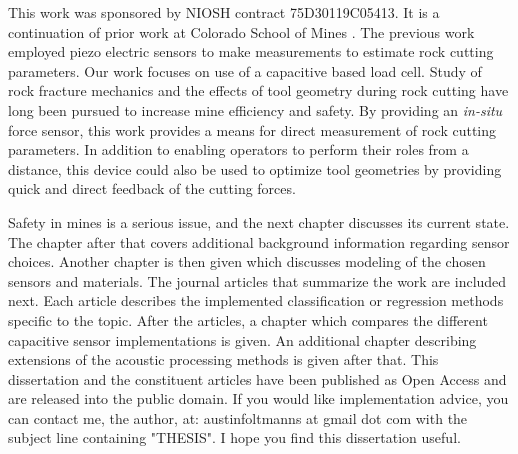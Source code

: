This work was sponsored by NIOSH contract 75D30119C05413.
It is a continuation of prior work at Colorado School of Mines \cite{11124/170545}.
The previous work employed piezo electric sensors to make measurements to estimate
rock cutting parameters. 
Our work focuses on use of a capacitive based load cell.
Study of rock fracture mechanics \cite{11124/14359} 
and the effects of tool geometry during rock cutting \cite{11124/13192, 11124/16423, 11124/176345} 
have long been pursued to increase mine efficiency and safety.
By providing an \textit{in-situ} force sensor, this work provides a means
for direct measurement of rock cutting parameters.
In addition to enabling operators to perform their roles from a distance,
this device could also be used to optimize tool geometries 
by providing quick and direct feedback of the cutting forces.

Safety in mines is a serious issue, and the next chapter discusses its current state.
The chapter after that covers additional background information regarding sensor choices.
Another chapter is then given which discusses modeling of the chosen sensors and materials.
The journal articles that summarize the work are included next. 
Each article describes the implemented classification or regression methods specific to the topic.
After the articles, a chapter which compares the different capacitive sensor implementations is given.
An additional chapter describing extensions of the acoustic processing methods is given after that.
This dissertation and the constituent articles have been published as 
Open Access and are released into the public domain.
If you would like implementation advice, you can contact me, the author, at:
austinfoltmanns at gmail dot com with the subject line containing "THESIS".
I hope you find this dissertation useful.

